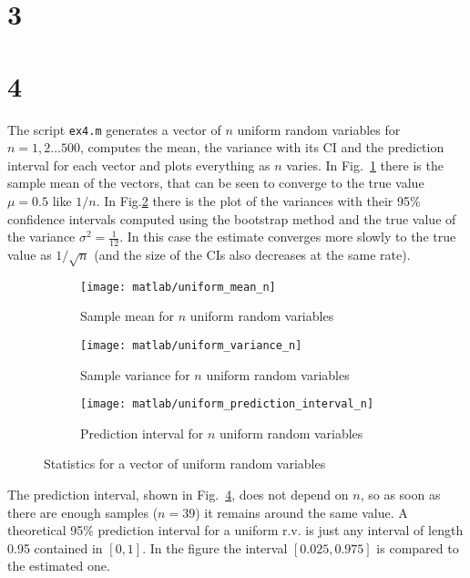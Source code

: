 \documentclass{article}
\newcommand{\inlinecode}[1]{\lstinline[basicstyle=\ttfamily,keywordstyle={}]{#1}}
\begin{document}
\section*{3}
\section*{4}
The script \inlinecode{ex4.m} generates a vector of $n$ uniform random
variables for $n = 1,2\dots500$, computes the mean, the variance with
its CI and the prediction interval for each vector and plots
everything as $n$ varies. In Fig.~\ref{uniform_mean} there is the
sample mean of the vectors, that can be seen to converge to the true
value $\mu=0.5$ like $1/n$. In Fig.\ref{uniform_var} there is the plot
of the variances with their 95\% confidence intervals computed using
the bootstrap method and the true value of the variance $\sigma^2 =
\frac{1}{12}$. In this case the estimate converges more slowly to the
true value as $1/\sqrt{n}$ (and the size of the CIs also decreases at
the same rate).
\begin{figure}[htbp]
  \centering
  \begin{subfigure}{.5\textwidth}
    \centering
    \texttt{[image: matlab/uniform\_mean\_n]}
    \caption{Sample mean for $n$ uniform random variables}
    \label{uniform_mean}
    \end{subfigure}%
  \begin{subfigure}{.5\textwidth}
    \centering
    \texttt{[image: matlab/uniform\_variance\_n]}
    \caption{Sample variance for $n$ uniform random variables}
    \label{uniform_var}
  \end{subfigure}
  \begin{subfigure}{.5\textwidth}
    \centering
    \texttt{[image: matlab/uniform\_prediction\_interval\_n]}
    \caption{Prediction interval for $n$ uniform random variables}
    \label{pred_int_unif}  
  \end{subfigure}
  \caption{Statistics for a vector of uniform random variables}
\end{figure}
The prediction interval, shown in Fig.~\ref{pred_int_unif}, does not
depend on $n$, so as soon as there are enough samples ($n=39$) it
remains around the same value. A theoretical 95\% prediction interval
for a uniform r.v. is just any interval of length 0.95 contained in
$[0,1]$. In the figure the interval $[0.025, 0.975]$ is compared to
the estimated one.
\end{document}
